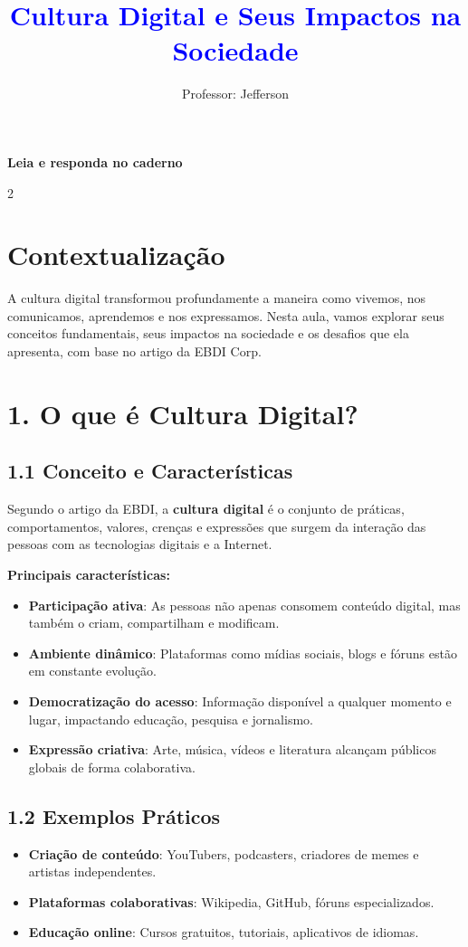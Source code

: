 \documentclass[12pt]{article}
\title{\textcolor{blue}{Cultura Digital e Seus Impactos na Sociedade }}
\author{Professor: Jefferson}
\date{}
\begin{document}
\maketitle
 \begin{center}
     \large { \textbf{Leia e responda no caderno}}
    \end{center}
\begin{multicols}{2}
       \section*{Contextualização}
A cultura digital transformou profundamente a maneira como vivemos, nos comunicamos, aprendemos e nos expressamos. Nesta aula, vamos explorar seus conceitos fundamentais, seus impactos na sociedade e os desafios que ela apresenta, com base no artigo da EBDI Corp.

\section*{1. O que é Cultura Digital?}
\subsection*{1.1 Conceito e Características}
Segundo o artigo da EBDI, a \textbf{cultura digital} é o conjunto de práticas, comportamentos, valores, crenças e expressões que surgem da interação das pessoas com as tecnologias digitais e a Internet.

\textbf{Principais características:}
\begin{itemize}
    \item \textbf{Participação ativa}: As pessoas não apenas consomem conteúdo digital, mas também o criam, compartilham e modificam.
    \item \textbf{Ambiente dinâmico}: Plataformas como mídias sociais, blogs e fóruns estão em constante evolução.
    \item \textbf{Democratização do acesso}: Informação disponível a qualquer momento e lugar, impactando educação, pesquisa e jornalismo.
    \item \textbf{Expressão criativa}: Arte, música, vídeos e literatura alcançam públicos globais de forma colaborativa.
\end{itemize}

\subsection*{1.2 Exemplos Práticos}
\begin{itemize}
    \item \textbf{Criação de conteúdo}: YouTubers, podcasters, criadores de memes e artistas independentes.
    \item \textbf{Plataformas colaborativas}: Wikipedia, GitHub, fóruns especializados.
    \item \textbf{Educação online}: Cursos gratuitos, tutoriais, aplicativos de idiomas.
\end{itemize}


\end{multicols}
\end{document}
